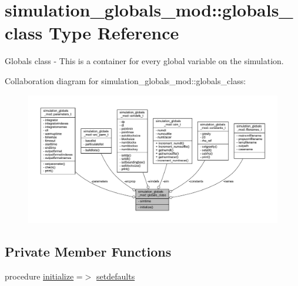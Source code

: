 \hypertarget{structsimulation__globals__mod_1_1globals__class}{}\section{simulation\+\_\+globals\+\_\+mod\+:\+:globals\+\_\+class Type Reference}
\label{structsimulation__globals__mod_1_1globals__class}


Globals class -\/ This is a container for every global variable on the simulation.  




Collaboration diagram for simulation\+\_\+globals\+\_\+mod\+:\+:globals\+\_\+class\+:
\nopagebreak
\begin{figure}[H]
\begin{center}
\leavevmode
\includegraphics[width=350pt]{structsimulation__globals__mod_1_1globals__class__coll__graph}
\end{center}
\end{figure}
\subsection*{Private Member Functions}
\begin{DoxyCompactItemize}
\item 
procedure \mbox{\hyperlink{structsimulation__globals__mod_1_1globals__class_a9438f8bdec469e7cbf9b898a398f9745}{initialize}} =$>$ \mbox{\hyperlink{namespacesimulation__globals__mod_a11bedd9242e49b12d9e305d45ef9ea00}{setdefaults}}
\end{DoxyCompactItemize}
